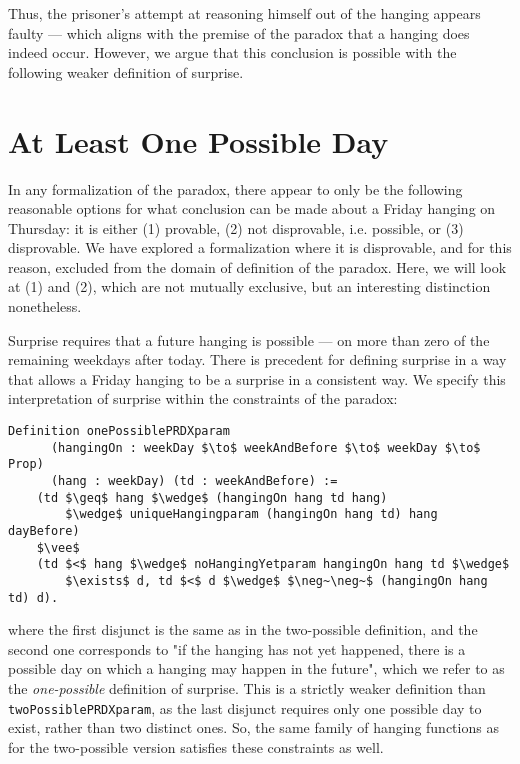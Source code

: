 \documentclass[runningheads]{llncs}
\begin{document}
Thus, the prisoner's attempt at reasoning himself out
of the hanging appears faulty --- which aligns with the premise of the
paradox that a hanging does indeed occur. However, we argue that this conclusion
is possible with the following weaker definition of surprise.

\section{At Least One Possible Day}
\label{sec:one}

In any formalization of the paradox, there appear to only be the following reasonable
options for what conclusion
can be made about a Friday hanging on Thursday: it is either (1) provable,
(2) not disprovable, i.e. possible, or (3) disprovable.
We have explored a formalization where it is disprovable, and for this reason,
excluded from the domain of definition of the paradox. Here, we will look at
(1) and (2), which are not mutually exclusive, but an interesting distinction nonetheless.

Surprise requires that a future hanging is possible --- on more than zero
of the remaining weekdays after today. There is precedent \cite{fourpossible}
for defining surprise
in a way that allows a Friday hanging to be a surprise in a consistent way.
We specify this interpretation of surprise within the constraints of the
paradox:

\begin{lstlisting}[mathescape=true]
  Definition onePossiblePRDXparam
      (hangingOn : weekDay $\to$ weekAndBefore $\to$ weekDay $\to$ Prop)
      (hang : weekDay) (td : weekAndBefore) :=
    (td $\geq$ hang $\wedge$ (hangingOn hang td hang)
        $\wedge$ uniqueHangingparam (hangingOn hang td) hang dayBefore)
    $\vee$
    (td $<$ hang $\wedge$ noHangingYetparam hangingOn hang td $\wedge$
        $\exists$ d, td $<$ d $\wedge$ $\neg~\neg~$ (hangingOn hang td) d).
\end{lstlisting}

where the first disjunct is the same as in the two-possible definition, and
the second one corresponds to "if the hanging has not yet happened, there is a
possible day on which a hanging may happen in the future", which
  we refer to as the \emph{one-possible} definition of surprise. This is a strictly
weaker definition than {\tt twoPossiblePRDXparam}, as the last
disjunct requires only one possible day to exist, rather than two distinct ones.
So, the same family of hanging functions as for the two-possible version satisfies these
constraints as well.
\end{document}
